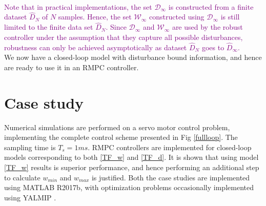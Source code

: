 \documentclass[letterpaper, 10 pt, conference]{ieeeconf}  %
\begin{document}
	 \\
	  \textcolor{purple}{Note that in practical implementations, the set $\mathcal{D}_{\infty}$ is constructed from a finite dataset $\hat{D}_{N}$ of $N$ samples. Hence, the set $\mathcal{W}_{\infty}$ constructed using $\mathcal{D}_{\infty}$ is still limited to the finite data set $\hat{D}_{N}$. Since $\mathcal{D}_{\infty}$ and $\mathcal{W}_{\infty}$ are used by the robust controller under the assumption that they capture all possible disturbances, robustness can only be achieved asymptotically as dataset $\hat{D}_{N}$ goes to $\hat{D}_{\infty}$. }\\
	We now have a closed-loop model with disturbance bound information, and hence are ready to use it in an RMPC controller.
	\section{Case study}
	Numerical simulations are performed on a servo motor control problem, implementing the complete control scheme presented in Fig \ref{fullloop}. The sampling time is $T_s = 1 ms$. RMPC controllers are implemented for closed-loop models corresponding to both \eqref{TF_w} and \eqref{TF_d}. It is shown that using model \eqref{TF_w} results is superior performance, and hence performing an additional step to calculate $w_{min}$ and $w_{max}$ is justified.
	Both the case studies are implemented using MATLAB R2017b, with optimization problems occasionally implemented using YALMIP \cite{Lofberg2004}.
	\label{Case studies}
	\iffalse
\end{document}

